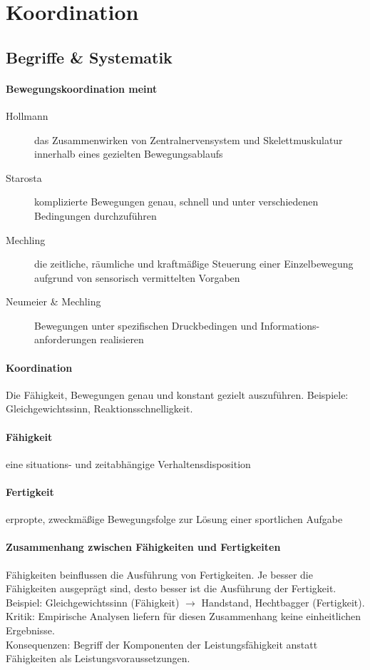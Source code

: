 \section{Koordination}

\subsection{Begriffe \& Systematik}
\paragraph{Bewegungskoordination meint}
\begin{description}
  \item[Hollmann] das Zusammenwirken von Zentralnervensystem und Skelettmuskulatur innerhalb eines gezielten Bewegungsablaufs
  \item[Starosta] komplizierte Bewegungen genau, schnell und unter verschiedenen Bedingungen durchzuführen
  \item[Mechling] die zeitliche, räumliche und kraftmäßige Steuerung einer Einzelbewegung aufgrund von sensorisch vermittelten Vorgaben
  \item[Neumeier \& Mechling] Bewegungen unter spezifischen Druckbedingen und Informations- anforderungen realisieren
\end{description}
\paragraph{Koordination} Die Fähigkeit, Bewegungen genau und konstant gezielt auszuführen. 
Beispiele: Gleichgewichtssinn, Reaktionsschnelligkeit.
\paragraph{Fähigkeit} eine situations- und zeitabhängige Verhaltensdisposition
\paragraph{Fertigkeit} erpropte, zweckmäßige Bewegungsfolge zur Lösung einer sportlichen Aufgabe
\paragraph{Zusammenhang zwischen Fähigkeiten und Fertigkeiten} Fähigkeiten beinflussen die Ausführung von Fertigkeiten.
Je besser die Fähigkeiten ausgeprägt sind, desto besser ist die Ausführung der Fertigkeit.
Beispiel: Gleichgewichtssinn (Fähigkeit) $\rightarrow$ Handstand, Hechtbagger (Fertigkeit).\\
Kritik: Empirische Analysen liefern für diesen Zusammenhang keine einheitlichen Ergebnisse.\\
Konsequenzen: Begriff der Komponenten der Leistungsfähigkeit anstatt Fähigkeiten als Leistungsvoraussetzungen.
